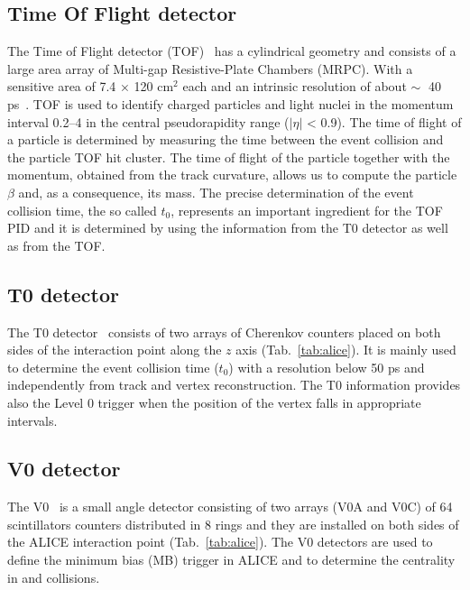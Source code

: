 %
\subsection{Time Of Flight detector} \label{sec:tof}

The Time of Flight detector (TOF)~\cite{alice_tof} has a cylindrical geometry and consists of a 
large area array of Multi-gap Resistive-Plate Chambers (MRPC).
With a sensitive area of 7.4 × 120 cm$^2$ each and an intrinsic resolution of about $\sim\;$ 40
ps~\cite{alicemulti}.
TOF is used to identify charged particles and light nuclei in the momentum interval 
0.2--4 \gevc in the central pseudorapidity range ($|\eta|$ < 0.9).
The time of flight of a particle is determined by measuring the time between the event collision and
the particle TOF hit cluster. 
The time of flight of the particle together with the momentum, obtained from the track curvature, 
allows us to compute the particle $\beta$ and, as a consequence, its mass.
The precise determination of the event collision time, the so called $t_{0}$, represents an important
ingredient for the TOF PID and it is determined by using the information from the T0 detector as 
well as from the TOF. 

%
\subsection{T0 detector} \label{sec:t0}

The T0 detector~\cite{alice_t0} consists of two arrays of Cherenkov counters placed on both 
sides of the interaction point along the $z$ axis (Tab.~\ref{tab:alice}).
It is mainly used to determine the event collision time ($t_{0}$) with a resolution below 50 ps
and  independently from track and vertex reconstruction. 
The T0 information provides also the Level 0 trigger when the position of the vertex falls in
appropriate intervals.

%
\subsection{V0 detector} \label{sec:v0}

The V0~\cite{alice_v0} is a small angle detector consisting of two arrays (V0A and V0C) of 64 
scintillators counters distributed in 8 rings and they are installed on both sides of the ALICE
interaction point (Tab.~\ref{tab:alice}). 
The V0 detectors are used to define the minimum bias (MB) trigger in ALICE and to determine the
centrality in \pPb and \PbPb collisions.

